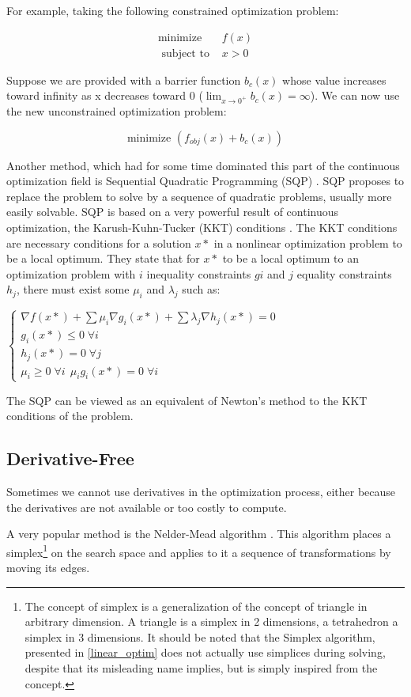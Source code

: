 For example, taking the following constrained optimization problem:

\begin{align*}
\text{minimize } &f(x)\\
\text{ subject to } &x > 0
\end{align*}

Suppose we are provided with a barrier function $b_c(x)$ whose value increases toward infinity as x decreases toward 0 ($\lim_{x \to 0^+}b_c(x) = \infty$). We can now use the new unconstrained optimization problem:	

$$\text{minimize } (f_{obj}(x) + b_c(x))$$

Another method, which had for some time dominated this part of the continuous optimization field is Sequential Quadratic Programming (SQP) \cite{boggs1995sequential}. SQP proposes to replace the problem to solve by a sequence of quadratic problems, usually more easily solvable.
SQP is based on a very powerful result of continuous optimization, the Karush-Kuhn-Tucker (KKT) conditions \cite{kuhn1951nonlinear}. The KKT conditions are necessary conditions for a solution $x*$ in a nonlinear optimization problem to be a local optimum. They state that for $x*$ to be a local optimum to an optimization problem with $i$ inequality constraints $gi$ and $j$ equality constraints $h_j$, there must exist some $\mu_i$ and $\lambda_j$ such as:

$\left\{
 		 \begin{array}{l}
			\nabla f(x*) + \displaystyle\sum \mu_i \nabla g_i(x*) + \displaystyle\sum \lambda_j \nabla h_j(x*) = 0 \\
			g_i(x*) \leq 0 \;\forall i \\
			h_j(x*) = 0 \;\forall j \\
			\mu_i \geq 0 \;\forall i\	\
			\mu_ig_i(x*) = 0 \;\forall i
		\end{array}
	\right. $
	
The SQP can be viewed as an equivalent of Newton's method to the KKT conditions of the problem.

\subsection{Derivative-Free}

Sometimes we cannot use derivatives in the optimization process, either because the derivatives are not available or too costly to compute.

A very popular method is the Nelder-Mead algorithm \cite{Nelder01011965}. This algorithm places a simplex\footnote{The concept of simplex is a generalization of the concept of triangle in arbitrary dimension. A triangle is a simplex in 2 dimensions, a tetrahedron a simplex in 3 dimensions. It should be noted that the Simplex algorithm, presented in \ref{linear_optim} does not actually use simplices during solving, despite that its misleading name implies, but is simply inspired from the concept.} on the search space and applies to it a sequence of transformations by moving its edges.

